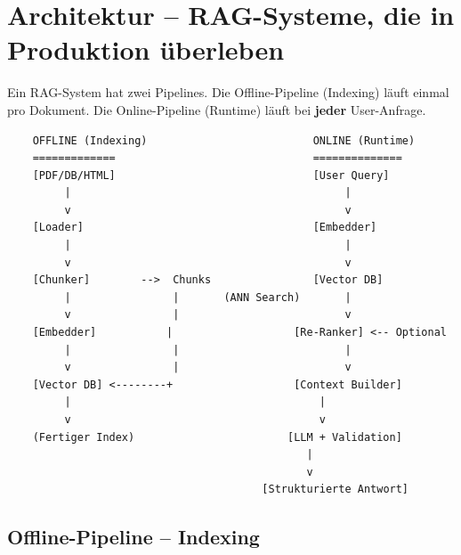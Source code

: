 \section{Architektur -- RAG-Systeme, die in Produktion überleben}

Ein RAG-System hat zwei Pipelines. Die Offline-Pipeline (Indexing) läuft einmal pro Dokument.
Die Online-Pipeline (Runtime) läuft bei \textbf{jeder} User-Anfrage.

\begin{verbatim}
    OFFLINE (Indexing)                          ONLINE (Runtime)
    =============                               ==============
    [PDF/DB/HTML]                               [User Query]
         |                                           |
         v                                           v
    [Loader]                                    [Embedder]
         |                                           |
         v                                           v
    [Chunker]        -->  Chunks                [Vector DB]
         |                |       (ANN Search)       |
         v                |                          v
    [Embedder]           |                   [Re-Ranker] <-- Optional
         |                |                          |
         v                |                          v
    [Vector DB] <--------+                   [Context Builder]
         |                                       |
         v                                       v
    (Fertiger Index)                        [LLM + Validation]
                                               |
                                               v
                                        [Strukturierte Antwort]
\end{verbatim}

\subsection{Offline-Pipeline -- Indexing}


